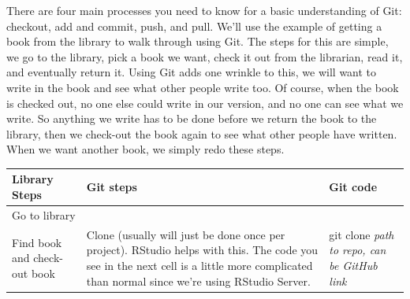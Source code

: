 \documentclass[
  12pt,
]{book}
\begin{document}
There are four main processes you need to know for a basic understanding of Git: checkout, add and commit, push, and pull. We'll use the example of getting a book from the library to walk through using Git. The steps for this are simple, we go to the library, pick a book we want, check it out from the librarian, read it, and eventually return it. Using Git adds one wrinkle to this, we will want to write in the book and see what other people write too. Of course, when the book is checked out, no one else could write in our version, and no one can see what we write. So anything we write has to be done before we return the book to the library, then we check-out the book again to see what other people have written. When we want another book, we simply redo these steps.

\begin{longtable}[]{@{}lll@{}}
\toprule
\begin{minipage}[b]{0.30\columnwidth}\raggedright
Library Steps\strut
\end{minipage} & \begin{minipage}[b]{0.30\columnwidth}\raggedright
Git steps\strut
\end{minipage} & \begin{minipage}[b]{0.30\columnwidth}\raggedright
Git code\strut
\end{minipage}\tabularnewline
\midrule
\endhead
\begin{minipage}[t]{0.30\columnwidth}\raggedright
Go to library\strut
\end{minipage} & \begin{minipage}[t]{0.30\columnwidth}\raggedright
\strut
\end{minipage} & \begin{minipage}[t]{0.30\columnwidth}\raggedright
\strut
\end{minipage}\tabularnewline
\begin{minipage}[t]{0.30\columnwidth}\raggedright
Find book and check-out book\strut
\end{minipage} & \begin{minipage}[t]{0.30\columnwidth}\raggedright
Clone (usually will just be done once per project). RStudio helps with this. The code you see in the next cell is a little more complicated than normal since we're using RStudio Server.\strut
\end{minipage} & \begin{minipage}[t]{0.30\columnwidth}\raggedright
git clone \emph{path to repo, can be GitHub link}\strut
\end{minipage}\tabularnewline

\end{longtable}
\end{document}
